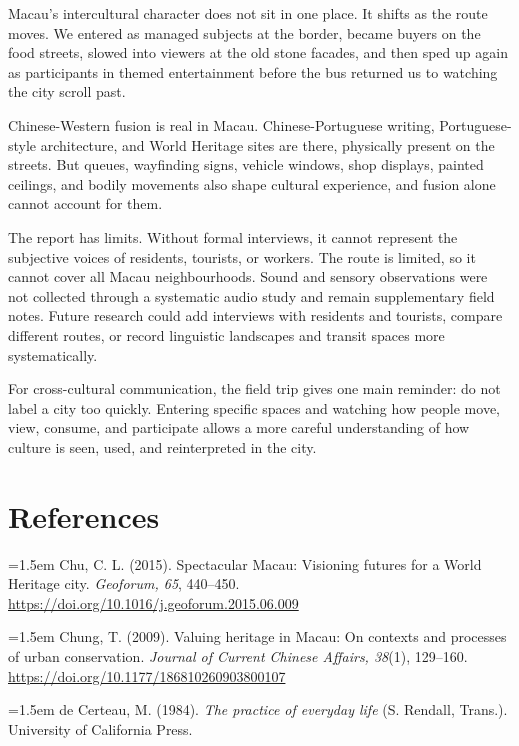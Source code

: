 \documentclass[12pt,a4paper]{article}
\begin{document}
Macau's intercultural character does not sit in one place. It shifts as the route moves. We entered as managed subjects at the border, became buyers on the food streets, slowed into viewers at the old stone facades, and then sped up again as participants in themed entertainment before the bus returned us to watching the city scroll past.

Chinese-Western fusion is real in Macau. Chinese-Portuguese writing, Portuguese-style architecture, and World Heritage sites are there, physically present on the streets. But queues, wayfinding signs, vehicle windows, shop displays, painted ceilings, and bodily movements also shape cultural experience, and fusion alone cannot account for them.

The report has limits. Without formal interviews, it cannot represent the subjective voices of residents, tourists, or workers. The route is limited, so it cannot cover all Macau neighbourhoods. Sound and sensory observations were not collected through a systematic audio study and remain supplementary field notes. Future research could add interviews with residents and tourists, compare different routes, or record linguistic landscapes and transit spaces more systematically.

For cross-cultural communication, the field trip gives one main reminder: do not label a city too quickly. Entering specific spaces and watching how people move, view, consume, and participate allows a more careful understanding of how culture is seen, used, and reinterpreted in the city.

\section*{References}

\noindent\hangindent=1.5em
Chu, C. L. (2015). Spectacular Macau: Visioning futures for a World Heritage city. \textit{Geoforum, 65}, 440--450. \url{https://doi.org/10.1016/j.geoforum.2015.06.009}

\noindent\hangindent=1.5em
Chung, T. (2009). Valuing heritage in Macau: On contexts and processes of urban conservation. \textit{Journal of Current Chinese Affairs, 38}(1), 129--160. \url{https://doi.org/10.1177/186810260903800107}

\noindent\hangindent=1.5em
de Certeau, M. (1984). \textit{The practice of everyday life} (S. Rendall, Trans.). University of California Press.
\end{document}
